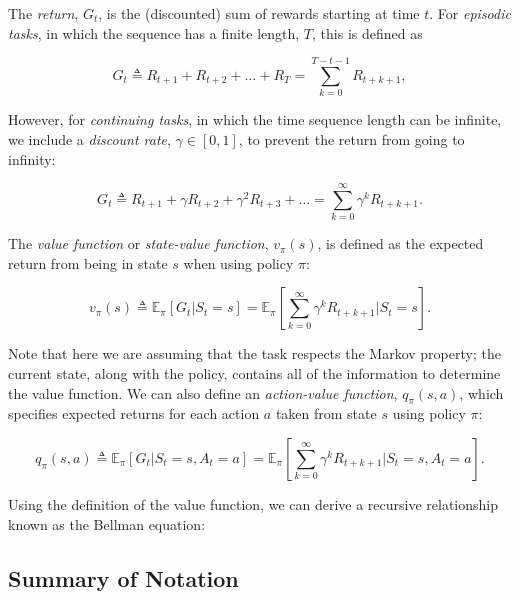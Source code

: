 The \textit{return}, $G_t$, is the (discounted) sum of rewards starting at time $t$. For \textit{episodic tasks}, in which the sequence has a finite length, $T$, this is defined as 

\begin{equation}
G_t \triangleq R_{t+1} + R_{t+2} + \dots + R_T = \sum_{k=0}^{T - t - 1} R_{t + k + 1},
\end{equation}

\noindent However, for \textit{continuing tasks}, in which the time sequence length can be infinite, we include a \textit{discount rate}, $\gamma \in [0, 1]$, to prevent the return from going to infinity:

\begin{equation}
G_t \triangleq R_{t+1} + \gamma R_{t+2} + \gamma^2 R_{t+3} + \dots = \sum_{k=0}^{\infty} \gamma^k R_{t + k + 1}.
\end{equation}

The \textit{value function} or \textit{state-value function}, $v_\pi (s)$, is defined as the expected return from being in state $s$ when using policy $\pi$:

\begin{equation}
	v_\pi (s) \triangleq \mathbb{E}_\pi \left[ G_t | S_t = s \right] = \mathbb{E}_\pi \left[ \sum_{k=0}^{\infty} \gamma^k R_{t + k + 1} | S_t = s \right].
\end{equation}

\noindent Note that here we are assuming that the task respects the Markov property; the current state, along with the policy, contains all of the information to determine the value function. We can also define an \textit{action-value function}, $q_\pi (s, a)$, which specifies expected returns for each action $a$ taken from state $s$ using policy $\pi$:

\begin{equation}
	q_\pi (s, a) \triangleq \mathbb{E}_\pi \left[ G_t | S_t = s, A_t = a \right] = \mathbb{E}_\pi \left[ \sum_{k=0}^{\infty} \gamma^k R_{t + k + 1} | S_t = s, A_t = a \right].
\end{equation}

Using the definition of the value function, we can derive a recursive relationship known as the Bellman equation:



\subsection{Summary of Notation}


